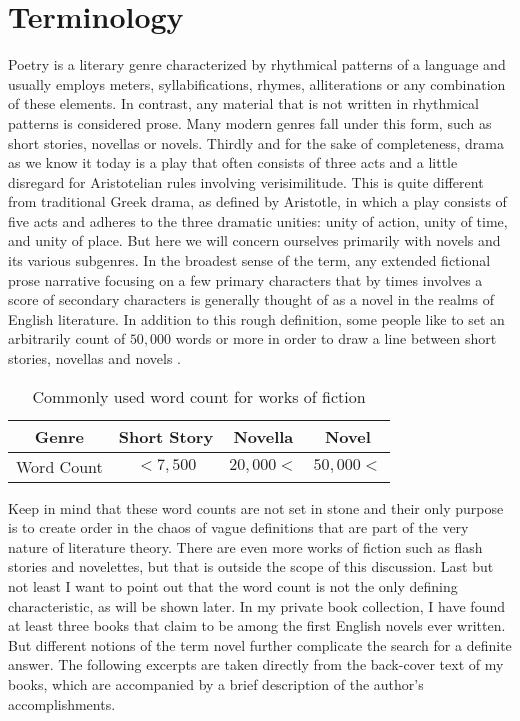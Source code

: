 \section{Terminology}

Poetry is a literary genre characterized by rhythmical patterns of a language 
and usually employs meters, syllabifications, rhymes, alliterations or any 
combination of these elements. In contrast, any material that is not written 
in rhythmical patterns is considered prose. Many modern genres fall under this 
form, such as short stories, novellas or novels. Thirdly and for the sake of 
completeness, drama as we know it today is a play that often consists of three 
acts and a little disregard for Aristotelian rules involving verisimilitude. 
This is quite different from traditional Greek drama, as defined by Aristotle, 
in which a play consists of five acts and adheres to the three dramatic unities: 
unity of action, unity of time, and unity of place. But here we will concern 
ourselves primarily with novels and its various subgenres. In the broadest sense
of the term, any extended fictional prose narrative focusing on a few primary 
characters that by times involves a score of secondary characters is generally 
thought of as a novel in the realms of English literature. In addition to this
rough definition, some people like to set an arbitrarily count of $50,000$ words 
or more in order to draw a line between short stories, novellas and novels 
\autocite{wheeler2018}.

\begin{table}[h]
    \centering
    \begin{tabular}{|c|c|c|c|}
        \hline
        Genre & Short Story & Novella & Novel \\
        \hline
        Word Count & $<7,500$ & $20,000<$ & $50,000<$\\
        \hline
    \end{tabular}
    \caption{Commonly used word count for works of fiction}\label{wordcount}
\end{table}

Keep in mind that these word counts are not set in stone and their only purpose 
is to create order in the chaos of vague definitions that are part of the very 
nature of literature theory. There are even more works of fiction such as flash 
stories and novelettes, but that is outside the scope of this discussion. Last 
but not least I want to point out that the word count is not the only defining 
characteristic, as will be shown later. In my private book collection, I have 
found at least three books that claim to be among the first English novels ever 
written. But different notions of the term novel further complicate the search 
for a definite answer. The following excerpts are taken directly from the 
back-cover text of my books, which are accompanied by a brief description of 
the author’s accomplishments.
